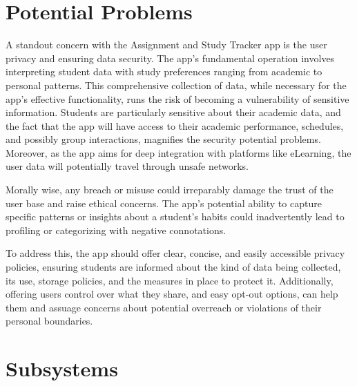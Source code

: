 \documentclass[12pt]{article}
\begin{document}
\section{Potential Problems}
    A standout concern with the Assignment and Study Tracker app is the user privacy and ensuring data security. The app's fundamental operation involves interpreting student data with study preferences ranging from academic to personal patterns. This comprehensive collection of data, while necessary for the app's effective functionality, runs the risk of becoming a vulnerability of sensitive information. Students are particularly sensitive about their academic data, and the fact that the app will have access to their academic performance, schedules, and possibly group interactions, magnifies the security potential problems. Moreover, as the app aims for deep integration with platforms like eLearning, the user data will potentially travel through unsafe networks.


     Morally wise, any breach or misuse could irreparably damage the trust of the user base and raise ethical concerns. The app's potential ability to capture specific patterns or insights about a student's habits could inadvertently lead to profiling or categorizing with negative connotations.

     To address this, the app should offer clear, concise, and easily accessible privacy policies, ensuring students are informed about the kind of data being collected, its use, storage policies, and the measures in place to protect it. Additionally, offering users control over what they share, and easy opt-out options, can help them and assuage concerns about potential overreach or violations of their personal boundaries.

\section{Subsystems}
\end{document}
